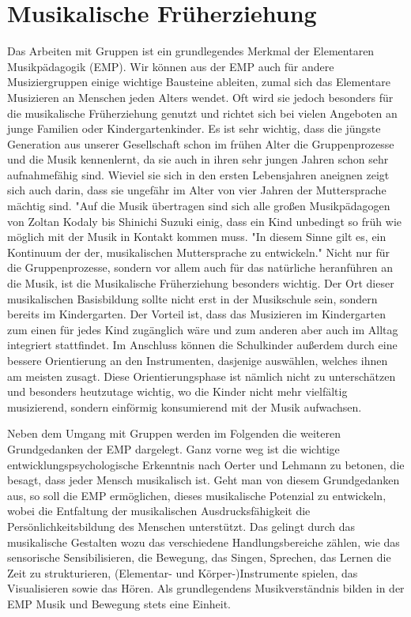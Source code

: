 \section{Musikalische Früherziehung}

Das Arbeiten mit Gruppen ist ein grundlegendes Merkmal der Elementaren
Musikpädagogik (EMP). Wir können aus der EMP auch für andere Musiziergruppen einige
wichtige Bausteine ableiten, zumal sich das Elementare Musizieren an Menschen
jeden Alters wendet. \autocite[226]{Busch:grundwissen_Instrumentalpädagogik} Oft
wird sie jedoch besonders für die musikalische Früherziehung genutzt und richtet
sich bei vielen Angeboten an junge Familien oder Kindergartenkinder. Es ist sehr wichtig, dass die jüngste Generation aus
unserer Gesellschaft schon im frühen Alter die Gruppenprozesse und die Musik kennenlernt, da
sie auch in ihren sehr jungen Jahren schon sehr aufnahmefähig sind. Wieviel sie
sich in den ersten Lebensjahren aneignen zeigt sich auch darin, dass sie
ungefähr im Alter von vier Jahren der Muttersprache mächtig sind. "Auf die Musik übertragen sind sich alle großen
Musikpädagogen von Zoltan Kodaly bis Shinichi Suzuki einig, dass ein Kind
unbedingt so früh wie möglich mit der Musik in Kontakt kommen muss. "In diesem
Sinne gilt es, ein Kontinuum der der, musikalischen Muttersprache zu
entwickeln." \autocite[45]{ernst:die_zukunftsfaehige_musikschule} Nicht nur
für die Gruppenprozesse, sondern vor allem auch für das natürliche heranführen an
die Musik, ist die Musikalische Früherziehung besonders wichtig.
Der Ort dieser musikalischen Basisbildung sollte nicht erst in der
Musikschule sein, sondern bereits im Kindergarten. \autocite[43]{ernst:die_zukunftsfaehige_musikschule}Der Vorteil ist, dass das
Musizieren im
Kindergarten zum einen für jedes Kind zugänglich wäre und zum anderen aber auch
im Alltag integriert stattfindet. Im Anschluss können die Schulkinder außerdem
durch eine bessere Orientierung an den Instrumenten, dasjenige auswählen,
welches ihnen am meisten zusagt. Diese Orientierungsphase ist nämlich nicht zu
unterschätzen und besonders heutzutage wichtig, wo die Kinder nicht mehr
vielfältig musizierend, sondern einförmig konsumierend mit der Musik aufwachsen.\autocite[37]{ernst:die_zukunftsfaehige_musikschule}

Neben dem Umgang mit Gruppen werden im Folgenden die weiteren Grundgedanken der EMP
dargelegt. Ganz vorne weg ist die wichtige entwicklungspsychologische Erkenntnis
nach Oerter und Lehmann zu betonen, die besagt, dass jeder Mensch musikalisch ist.\autocite[88]{musikalische_begabung}
Geht man von diesem Grundgedanken aus, so soll die EMP ermöglichen, dieses musikalische Potenzial zu
entwickeln, wobei die Entfaltung der musikalischen Ausdrucksfähigkeit die
Persönlichkeitsbildung des Menschen unterstützt. Das gelingt durch das musikalische Gestalten
wozu das verschiedene Handlungsbereiche zählen, wie das sensorische
Sensibilisieren, die Bewegung, das Singen, Sprechen, das Lernen die Zeit zu
strukturieren, (Elementar-  und Körper-)Instrumente spielen, das Visualisieren
sowie das Hören. \autocite[227]{Busch:grundwissen_Instrumentalpädagogik} Als
grundlegendens Musikverständnis bilden in der EMP Musik und Bewegung stets eine
Einheit.

